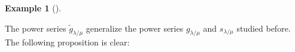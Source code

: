 \documentclass[numbers=enddot,12pt,final,onecolumn,notitlepage]{scrartcl}%
\theoremstyle{definition}
\newtheorem{exmp}[theo]{Example}
\newenvironment{example}[1][]
{\begin{exmp}[#1]\begin{leftbar}}
{\end{leftbar}\end{exmp}}
\let\sumnonlimits\sum
\renewcommand{\sum}{\sumnonlimits\limits}
\def\lm{{\lambda/\mu}}
\begin{document}
\begin{example}
\begin{enumerate}
\begin{comment}
\item[\textbf{(c)}] Let now $n=3$, let $\lambda=\left(  2,1\right)  $ and let
$\mu=\varnothing$. Then, the rpps $T$ of shape $\lm$
have the form $%
\ytableausetup{notabloids}
\begin{ytableau}
a & b \\
c
\end{ytableau}%
$ with $a\leq b$ and $a\leq c$. Each such rpp $T$ satisfies $\mathbf{t}%
^{\operatorname*{ceq}\left(  T\right)  }=\left\{
\begin{array}
[c]{c}%
1,\text{ if }a<c;\\
t_{1},\text{ if }a=c
\end{array}
\right.  $ and $\mathbf{x}^{\operatorname*{ircont}\left(  T\right)  }=\left\{
%
\begin{array}
[c]{c}%
x_{a}x_{b}x_{c},\ \text{if }a<c;\\
x_{a}x_{b},\ \text{if }a=c
\end{array}
\right.  $. Thus,%
\begin{align*}
\widetilde{g}_{\lambda/\mu}  &  =\sum_{\substack{T\text{ is an rpp}\\\text{of
shape }\lm }}\mathbf{t}^{\operatorname*{ceq}\left(
T\right)  }\mathbf{x}^{\operatorname*{ircont}\left(  T\right)  }=\sum_{a\leq
b;\ a\leq c}\left\{
\begin{array}
[c]{c}%
1,\text{ if }a<c;\\
t_{1},\text{ if }a=c
\end{array}
\right.  \left\{
\begin{array}
[c]{c}%
x_{a}x_{b}x_{c},\ \text{if }a<c;\\
x_{a}x_{b},\ \text{if }a=c
\end{array}
\right. \\
&  =\sum_{a\leq b;\ a<c}x_{a}x_{b}x_{c}+t_{1}\sum_{a\leq b}x_{a}x_{b}.
\end{align*}

\end{comment}
\end{enumerate}

\end{example}

The power series $\widetilde{g}_{\lambda/\mu}$ generalize the power series
$g_{\lambda/\mu}$ and $s_{\lambda/\mu}$ studied before. The following proposition is clear:
\end{document}
